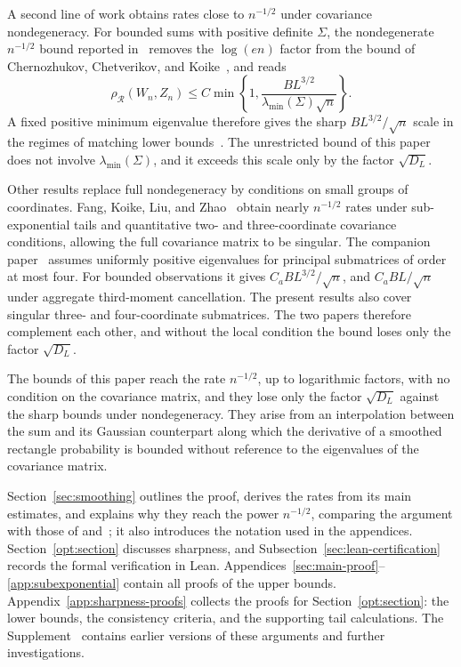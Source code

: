 \documentclass[11pt,letterpaper]{article}
\theoremstyle{remark}
\newcommand{\rh}{\rho_{\mathcal R}}
\begin{document}
A second line of work obtains rates close to \(n^{-1/2}\) under
covariance nondegeneracy. For bounded sums with positive definite
\(\Sigma\), the nondegenerate \(n^{-1/2}\) bound reported in~\cite[Theorem~1.1]{AL} removes the
\(\log(en)\) factor from the bound of Chernozhukov, Chetverikov,
and Koike~\cite[Corollary~2.1]{CCK}, and reads
\begin{equation*}
 \rh(W_n,Z_n)\le C\min\left\{1,
 \frac{BL^{3/2}}{\lambda_{\min}(\Sigma)\sqrt n}\right\}.
\end{equation*}
A fixed positive minimum eigenvalue therefore gives the sharp
\(BL^{3/2}/\sqrt n\) scale in the regimes of matching lower
bounds~\cite[Proposition~2.1]{CCK}.
The unrestricted bound of this paper does not involve \(\lambda_{\min}(\Sigma)\),
and it exceeds this scale only by the factor \(\sqrt{D_L}\).

Other results replace full nondegeneracy by conditions on small
groups of coordinates. Fang, Koike, Liu, and Zhao~\cite[Theorem~1.1]{FKLZ} obtain nearly
\(n^{-1/2}\) rates under sub-exponential tails and quantitative
two- and three-coordinate covariance conditions, allowing the full
covariance matrix to be singular. The companion paper~\cite{Local}
assumes uniformly positive eigenvalues for principal submatrices of
order at most four. For bounded observations it gives
\(C_aBL^{3/2}/\sqrt n\), and \(C_aBL/\sqrt n\) under aggregate
third-moment cancellation. The present results also cover singular
three- and four-coordinate submatrices. The two papers therefore
complement each other, and without the local condition the bound loses
only the factor \(\sqrt{D_L}\).

The bounds of this paper reach the rate \(n^{-1/2}\), up to logarithmic factors, with
no condition on the covariance matrix, and they lose only the factor
\(\sqrt{D_L}\) against the sharp bounds under nondegeneracy. They arise
from an interpolation between the sum and its Gaussian counterpart along
which the derivative of a smoothed rectangle probability is bounded
without reference to the eigenvalues of the covariance matrix.

Section~\ref{sec:smoothing} outlines the proof, derives
the rates from its main estimates, and explains why they reach the
power \(n^{-1/2}\), comparing the argument with those of \cite{AL} and~\cite{GaoZhang}; it also introduces the
notation used in the appendices. Section~\ref{opt:section}
discusses sharpness, and Subsection~\ref{sec:lean-certification}
records the formal verification in Lean.
Appendices~\ref{sec:main-proof}--\ref{app:subexponential}
contain all proofs of the upper bounds. Appendix~\ref{app:sharpness-proofs}
collects the proofs for Section~\ref{opt:section}: the lower bounds,
the consistency criteria, and the supporting tail calculations. The
Supplement~\cite{Supplement} contains earlier versions of these
arguments and further investigations.
\end{document}
